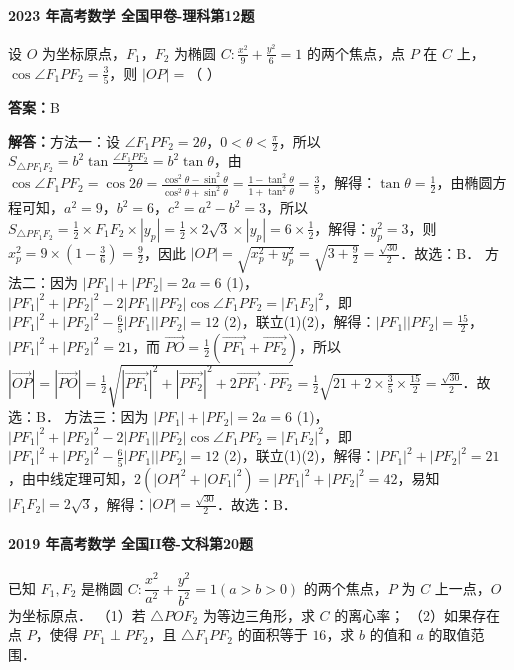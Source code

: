 \documentclass[UTF8,a4paper,11pt]{ctexart}
\begin{document}
\paragraph{2023 年高考数学 全国甲卷-理科第12题}

设 $O$ 为坐标原点，$F_1$，$F_2$ 为椭圆 $C: \frac{x^2}{9} + \frac{y^2}{6} = 1$ 的两个焦点，点 $P$ 在 $C$ 上，$\cos\angle F_1PF_2 = \frac{3}{5}$，则 $|OP| = $（         ）

\textbf{答案：}B\par

\textbf{解答：}方法一：设 $\angle F_1PF_2 = 2\theta$，$0<\theta<\frac{\pi}{2}$，所以 $S_{\triangle PF_1F_2} = b^2\tan\frac{\angle F_1PF_2}{2} = b^2\tan\theta$，由 $\cos\angle F_1PF_2 = \cos2\theta = \frac{\cos^2\theta-\sin^2\theta}{\cos^2\theta+\sin^2\theta} = \frac{1-\tan^2\theta}{1+\tan^2\theta} = \frac{3}{5}$，解得：$\tan\theta = \frac{1}{2}$，由椭圆方程可知，$a^2=9$，$b^2=6$，$c^2=a^2-b^2=3$，所以 $S_{\triangle PF_1F_2} = \frac{1}{2}\times F_1F_2\times|y_p| = \frac{1}{2}\times2\sqrt{3}\times|y_p| = 6\times\frac{1}{2}$，解得：$y_p^2=3$，则 $x_p^2 = 9\times\left(1-\frac{3}{6}\right) = \frac{9}{2}$，因此 $|OP| = \sqrt{x_p^2+y_p^2} = \sqrt{3+\frac{9}{2}} = \frac{\sqrt{30}}{2}$．故选：B．
方法二：因为 $|PF_1|+|PF_2|=2a=6$ (1)，$|PF_1|^2+|PF_2|^2-2|PF_1||PF_2|\cos\angle F_1PF_2 = |F_1F_2|^2$，即 $|PF_1|^2+|PF_2|^2 - \frac{6}{5}|PF_1||PF_2| = 12$ (2)，联立(1)(2)，解得：$|PF_1||PF_2| = \frac{15}{2}$，$|PF_1|^2+|PF_2|^2 = 21$，而 $\overrightarrow{PO} = \frac{1}{2}(\overrightarrow{PF_1}+\overrightarrow{PF_2})$，所以 $|\overrightarrow{OP}| = |\overrightarrow{PO}| = \frac{1}{2}\sqrt{|\overrightarrow{PF_1}|^2+|\overrightarrow{PF_2}|^2+2\overrightarrow{PF_1}\cdot\overrightarrow{PF_2}} = \frac{1}{2}\sqrt{21+2\times\frac{3}{5}\times\frac{15}{2}} = \frac{\sqrt{30}}{2}$．故选：B．
方法三：因为 $|PF_1|+|PF_2|=2a=6$ (1)，$|PF_1|^2+|PF_2|^2-2|PF_1||PF_2|\cos\angle F_1PF_2 = |F_1F_2|^2$，即 $|PF_1|^2+|PF_2|^2 - \frac{6}{5}|PF_1||PF_2| = 12$ (2)，联立(1)(2)，解得：$|PF_1|^2+|PF_2|^2 = 21$，由中线定理可知，$2(|OP|^2+|OF_1|^2) = |PF_1|^2+|PF_2|^2 = 42$，易知 $|F_1F_2| = 2\sqrt{3}$，解得：$|OP| = \frac{\sqrt{30}}{2}$．故选：B．

\paragraph{2019 年高考数学 全国II卷-文科第20题}

已知 $F_1,F_2$ 是椭圆 $C:\dfrac{x^2}{a^2}+\dfrac{y^2}{b^2}=1(a>b>0)$ 的两个焦点，$P$ 为 $C$ 上一点，$O$ 为坐标原点．
（1）若 $\triangle POF_2$ 为等边三角形，求 $C$ 的离心率；
（2）如果存在点 $P$，使得 $PF_1\perp PF_2$，且 $\triangle F_1PF_2$ 的面积等于 $16$，求 $b$ 的值和 $a$ 的取值范围．
\end{document}
